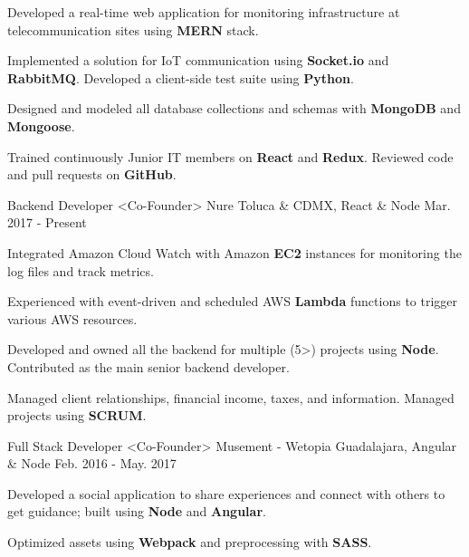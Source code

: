 \begin{cventries}
{\begin{cvitems}
        \item {Developed a real-time web application for monitoring infrastructure at telecommunication sites using \textbf{MERN} stack.}
        \item {Implemented a solution for IoT communication using \textbf{Socket.io} and \textbf{RabbitMQ}. Developed a client-side test suite using \textbf{Python}.}
        \item {Designed and modeled all database collections and schemas with \textbf{MongoDB} and \textbf{Mongoose}.}
        \item {Trained continuously Junior IT members on \textbf{React} and \textbf{Redux}. Reviewed code and pull requests on \textbf{GitHub}.}
      \end{cvitems}
    }
    \cventry
      {Backend Developer <Co-Founder>}
      {Nure}
      {Toluca \& CDMX, React \& Node}
      {Mar. 2017 - Present}
      {
        \begin{cvitems}
          \item {Integrated Amazon Cloud Watch with Amazon \textbf{EC2} instances for monitoring the log files and track metrics.}
          \item {Experienced with event-driven and scheduled AWS \textbf{Lambda} functions to trigger various AWS resources.}
          \item {Developed and owned all the backend for multiple (5>) projects using \textbf{Node}. Contributed as the main senior backend developer.}
           \item {Managed client relationships, financial income, taxes, and information. Managed projects using \textbf{SCRUM}.}
        \end{cvitems}
      }
    \cventry
      {Full Stack Developer <Co-Founder>}
      {Musement - Wetopia}
      {Guadalajara, Angular \& Node}
      {Feb. 2016 - May. 2017}
      {
        \begin{cvitems}
          \item {Developed a social application to share experiences and connect with others to get guidance; built using \textbf{Node} and \textbf{Angular}.}
          \item {Optimized assets using \textbf{Webpack} and preprocessing with \textbf{SASS}.}
        \end{cvitems}
      }
  \end{cventries}
